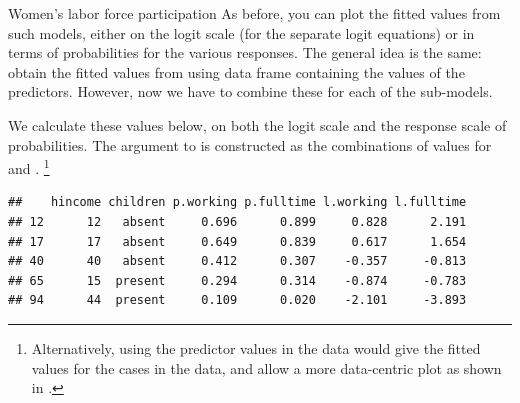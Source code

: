 \documentclass[11pt]{book}
\renewenvironment{knitrout}{\small\renewcommand{\baselinestretch}{.85}}{} %
\begin{document}
\begin{Example}[wlfpart1]{Women's labor force participation}
As before, you can plot the fitted values from such models, either
on the logit scale (for the separate logit equations) or in
terms of probabilities for the various responses.
The general idea is the same:  obtain the fitted values
from  using data frame containing the values
of the predictors. However, now we have to combine these
for each of the sub-models.

We calculate these values below, on both the logit scale
and the response scale of probabilities. The 
argument to  is constructed as the combinations
of values for  and .%
\footnote{
Alternatively, using the predictor values in the  data
would give the fitted values for the cases in the data,
and allow a more data-centric plot as shown in .
}
\begin{knitrout}\footnotesize
{}\color{fgcolor}\begin{kframe}
\begin{alltt}
 \hlkwb{<-} \hlstd{(}\hlstd{=}\hlopt{:}\hlstd{,}
                          \hlstd{=}\hlstd{(}\hlstd{,} \hlstd{))}
 \hlkwb{<-} 
     \hlstd{=}  \hlstd{=}\hlstd{),}
     \hlstd{=}  \hlstd{=}\hlstd{),}
     \hlstd{=}  \hlstd{=}\hlstd{),}
     \hlstd{=}  \hlstd{=}\hlstd{)}
\hlstd{)}
\hlstd{(} \hlstd{),} \hlstd{=}\hlstd{)}
\end{alltt}
\begin{verbatim}
##    hincome children p.working p.fulltime l.working l.fulltime
## 12      12   absent     0.696      0.899     0.828      2.191
## 17      17   absent     0.649      0.839     0.617      1.654
## 40      40   absent     0.412      0.307    -0.357     -0.813
## 65      15  present     0.294      0.314    -0.874     -0.783
## 94      44  present     0.109      0.020    -2.101     -3.893
\end{verbatim}
\end{kframe}

\end{knitrout}
\end{Example}
\end{document}
